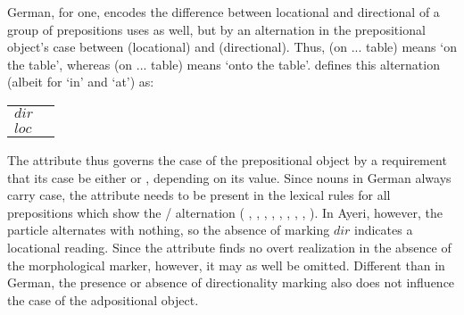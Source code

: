 \begin{morphlex}
\pex\label{ex:adpmorphlex}%
\a{}

\a{}
\xe
\end{morphlex}


German, for one, encodes the difference between locational and directional of a
group of prepositions uses as well, but by an alternation in the prepositional
object's case between \Dat{} (locational) and \Acc{} (directional). Thus,
 (on \Def{}.\Dat{}.\M{}.\Sg{} table) means `on the table',
whereas  (on \Def{}.\Acc{}.\M {}.\Sg{} table) means `onto the
table'. \citet{butt2005} defines this alternation (albeit for  `in' and
 `at') as:

\ex{}%
\begin{tabular}[t]{l @{ $\implies$ } l}
\PSem{} $dir$ & \ups{\Obj{} \Case{}} \req{} \Acc{} \\
\PSem{} $loc$ & \ups{\Obj{} \Case{}} \req{} \Dat{} \\
\end{tabular}
\xe

The \PSem{} attribute thus governs the case of the prepositional object by a
requirement that its case be either \Acc{} or \Dat{}, depending on its value.
Since nouns in German always carry case, the \PSem{} attribute needs to be
present in the lexical rules for all prepositions which show the \Acc{}/\Dat{}
alternation (%
,
,
,
,
,
,
,
,
%
). In Ayeri, however, the particle  alternates with nothing, so
the absence of marking $dir$ indicates a locational reading. Since the \PSem{}
attribute finds no overt realization in the absence of the morphological
marker, however, it may as well be omitted. Different than in German, the
presence or absence of directionality marking also does not influence the case
of the adpositional object.

